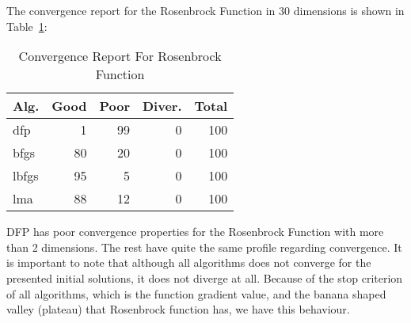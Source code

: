 
The convergence report for the Rosenbrock Function in 30 dimensions is shown in Table~\ref{convergence:rosenbrock30d}:

\begin{table}[H]
\centering
\caption{Convergence Report For Rosenbrock Function}
\label{convergence:rosenbrock30d}
\begin{tabular}{lrrrr}
\toprule
 Alg. &  Good &  Poor &  Diver. &  Total \\
\midrule
  dfp &     1 &    99 &       0 &    100 \\
 bfgs &    80 &    20 &       0 &    100 \\
lbfgs &    95 &     5 &       0 &    100 \\
  lma &    88 &    12 &       0 &    100 \\
\bottomrule
\end{tabular}
\end{table}

DFP has poor convergence properties for the Rosenbrock Function with more than 2 dimensions.
The rest have quite the same profile regarding convergence. It is important to note that
although all algorithms does not converge for the presented initial solutions, it does not
diverge at all. Because of the stop criterion of all algorithms, which is the function gradient value,
and the banana shaped valley (plateau) that Rosenbrock function has, we have this behaviour.